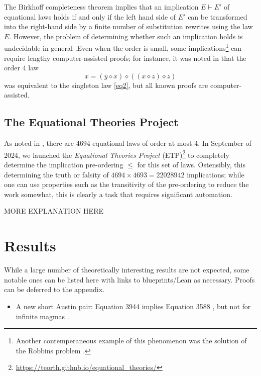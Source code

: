 \documentclass[12pt]{article}
\theoremstyle{definition}
\newcommand{\op}{\diamond}
\begin{document}
The Birkhoff completeness theorem \cite[Th. 3.5.14]{term-rewriting} implies that an implication $E \vdash E'$ of equational laws holds if and only if the left hand side of $E'$ can be transformed into the right-hand side by a finite number of substitution rewrites using the law $E$.  However, the problem of determining whether such an implication holds is undecidable in general \cite{mckenzie}.Even when the order is small, some implications\footnote{Another contemperaneous example of this phenomenon was the solution of the Robbins problem \cite{robbins}.} can require lengthy computer-assisted proofs; for instance, it was noted in \cite{Kisielewicz2} that the order $4$ law
\begin{equation}\label{eq1689}\tag{E1689}
    x = (y \op x) \op ((x \op z) \op z)
\end{equation}
was equivalent to the singleton law \eqref{eq2}, but all known proofs are computer-assisted.

\subsection{The Equational Theories Project}

As noted in , there are $4694$ equational laws of order at most $4$.  In September of 2024, we launched the \emph{Equational Theories Project} (ETP)\footnote{\url{https://teorth.github.io/equational_theories/}} to completely determine the implication pre-ordering $\leq$ for this set of laws.  Ostensibly, this determining the truth or falsity of $4694 \times 4693 = 22028942$ implications; while one can use properties such as the transitivity of the pre-ordering to reduce the work somewhat, this is clearly a task that requires significant automation.

MORE EXPLANATION HERE






\section{Results}
While a large number of theoretically interesting results are not expected, some notable ones can be listed here with links to blueprints/Lean as necessary. Proofs can be deferred to the appendix.

\begin{itemize}
    \item A new short Austin pair: Equation 3944 implies Equation 3588 \cite{finite_magmas}, but not for infinite magmas \cite{infinite_magmas}.
\end{itemize}
\end{document}
